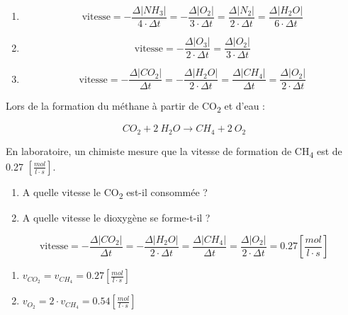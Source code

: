 \documentclass[
  11pt,
  french,
  a4paper,
  openany]{book}
\begin{document}
\begin{Answer}

\begin{enumerate}
\def\labelenumi{\arabic{enumi}.}
\item
  \[
  \text{vitesse} = - \frac{\Delta |NH_3|}{4 \cdot \Delta t} = - \frac{\Delta |O_2|}{3 \cdot \Delta t} = \frac{\Delta |N_2|}{2 \cdot \Delta t} = \frac{\Delta |H_2O|}{6 \cdot \Delta t}
  \]
\item
  \[
  \text{vitesse} = - \frac{\Delta |O_3|}{2 \cdot \Delta t} = \frac{\Delta |O_2|}{3 \cdot \Delta t}
  \]
\item
  \[
  \text{vitesse} = - \frac{\Delta |CO_2|}{\Delta t} = - \frac{\Delta |H_2O|}{2 \cdot \Delta t} = \frac{\Delta |CH_4|}{\Delta t} = \frac{\Delta |O_2|}{2 \cdot \Delta t}
  \]
\end{enumerate}


\end{Answer}

\begin{Exercise}

Lors de la formation du méthane à partir de CO\textsubscript{2} et d'eau :

\[ CO_2 + 2\ H_2O \rightarrow CH_4 + 2\ O_2 \]

En laboratoire, un chimiste mesure que la vitesse de formation de CH\textsubscript{4} est de 0.27 \(\left[\frac{mol}{l \cdot s}\right]\).

\begin{enumerate}
\def\labelenumi{\arabic{enumi}.}
\item
  A quelle vitesse le CO\textsubscript{2} est-il consommée ?
\item
  A quelle vitesse le dioxygène se forme-t-il ?
\end{enumerate}


\end{Exercise}

\begin{Answer}

\[
\text{vitesse} = - \frac{\Delta |CO_2|}{\Delta t} = - \frac{\Delta |H_2O|}{2 \cdot \Delta t} = \frac{\Delta |CH_4|}{\Delta t} = \frac{\Delta |O_2|}{2 \cdot \Delta t} = 0.27 \left[\frac{mol}{l \cdot s}\right]
\]

\begin{enumerate}
\def\labelenumi{\arabic{enumi}.}
\item
  \(v_{CO_2} = v_{CH_4} = 0.27 \left[\frac{mol}{l \cdot s}\right]\)
\item
  \(v_{O_2} = 2 \cdot v_{CH_4} = 0.54 \left[\frac{mol}{l \cdot s}\right]\)
\end{enumerate}

\newpage


\end{Answer}
\end{document}
